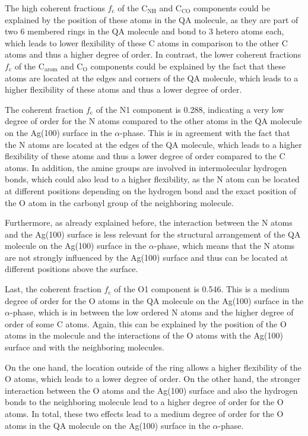 The high coherent fractions $f_\mathrm{c}$ of the $\mathrm{C_{NH}}$ and $\mathrm{C_{CO}}$ components could be explained by the position of these atoms in the \ac{QA} molecule, as they are part of two 6 membered rings in the \ac{QA} molecule and bond to 3 hetero atoms each, which leads to lower flexibility of these C atoms in comparison to the other C atoms and thus a higher degree of order. In contrast, the lower coherent fractions $f_\mathrm{c}$ of the $\mathrm{C_{arom}}$ and $\mathrm{C_{O}}$ components could be explained by the fact that these atoms are located at the edges and corners of the \ac{QA} molecule, which leads to a higher flexibility of these atoms and thus a lower degree of order.

The coherent fraction $f_\mathrm{c}$ of the N1 component is 0.288, indicating a very low degree of order for the N atoms compared to the other atoms in the \ac{QA} molecule on the Ag(100) surface in the $\alpha$-phase. This is in agreement with the fact that the N atoms are located at the edges of the \ac{QA} molecule, which leads to a higher flexibility of these atoms and thus a lower degree of order compared to the C atoms. In addition, the amine groups are involved in intermolecular hydrogen bonds, which could also lead to a higher flexibility, as the N atom can be located at different positions depending on the hydrogen bond and the exact position of the O atom in the carbonyl group of the neighboring molecule.

Furthermore, as already explained before, the interaction between the N atoms and the Ag(100) surface is less relevant for the structural arrangement of the \ac{QA} molecule on the Ag(100) surface in the $\alpha$-phase, which means that the N atoms are not strongly influenced by the Ag(100) surface and thus can be located at different positions above the surface.

Last, the coherent fraction $f_\mathrm{c}$ of the O1 component is 0.546. This is a medium degree of order for the O atoms in the \ac{QA} molecule on the Ag(100) surface in the $\alpha$-phase, which is in between the low ordered N atoms and the higher degree of order of some C atoms. Again, this can be explained by the position of the O atoms in the molecule and the interactions of the O atoms with the Ag(100) surface and with the neighboring molecules. 

On the one hand, the location outside of the ring allows a higher flexibility of the O atoms, which leads to a lower degree of order. On the other hand, the stronger interaction between the O atoms and the Ag(100) surface and also the hydrogen bonds to the neighboring molecule lead to a higher degree of order for the O atoms. In total, these two effects lead to a medium degree of order for the O atoms in the \ac{QA} molecule on the Ag(100) surface in the $\alpha$-phase.


